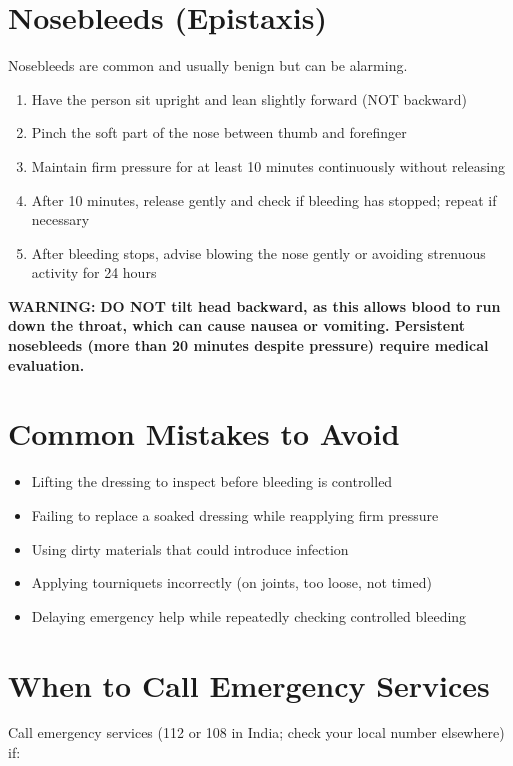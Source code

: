 \section{Nosebleeds (Epistaxis)}

Nosebleeds are common and usually benign but can be alarming.

\begin{enumerate}[leftmargin=*]
\item Have the person sit upright and lean slightly forward (NOT backward)
\item Pinch the soft part of the nose between thumb and forefinger
\item Maintain firm pressure for at least 10 minutes continuously without releasing
\item After 10 minutes, release gently and check if bleeding has stopped; repeat if necessary
\item After bleeding stops, advise blowing the nose gently or avoiding strenuous activity for 24 hours
\end{enumerate}
\textbf{WARNING:} \textbf{DO NOT tilt head backward, as this allows blood to run down the throat, which can cause nausea or vomiting. Persistent nosebleeds (more than 20 minutes despite pressure) require medical evaluation.}

\section{Common Mistakes to Avoid}

\begin{itemize}[leftmargin=*]
  \item Lifting the dressing to inspect before bleeding is controlled
  \item Failing to replace a soaked dressing while reapplying firm pressure
  \item Using dirty materials that could introduce infection
  \item Applying tourniquets incorrectly (on joints, too loose, not timed)
  \item Delaying emergency help while repeatedly checking controlled bleeding
\end{itemize}

\section{When to Call Emergency Services}

Call emergency services (112 or 108 in India; check your local number elsewhere) if:

